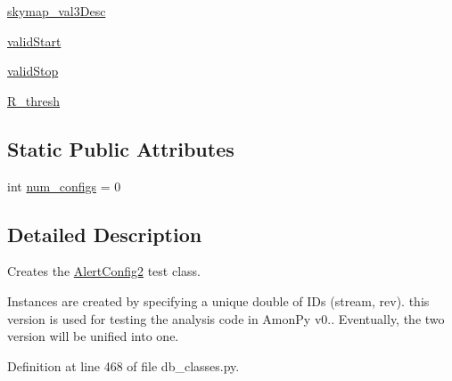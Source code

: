 \begin{DoxyCompactItemize}
\item 
\hyperlink{classamonpy_1_1dbase_1_1db__classes_1_1_alert_config2_a6c28894bd6690a2b0faeb36be8eb351f}{skymap\-\_\-val3\-Desc}
\item 
\hyperlink{classamonpy_1_1dbase_1_1db__classes_1_1_alert_config2_ac8bd043fc32dc2de20f5ee1cf57762e7}{valid\-Start}
\item 
\hyperlink{classamonpy_1_1dbase_1_1db__classes_1_1_alert_config2_a0338a9f4188da7e5b4e977a6d6a32dff}{valid\-Stop}
\item 
\hyperlink{classamonpy_1_1dbase_1_1db__classes_1_1_alert_config2_a94dabae815e574e6453b65d4efd9c0b0}{R\-\_\-thresh}
\end{DoxyCompactItemize}
\subsection*{Static Public Attributes}
\begin{DoxyCompactItemize}
\item 
int \hyperlink{classamonpy_1_1dbase_1_1db__classes_1_1_alert_config2_a17be669e8bdfa435ca0fe275a71479dd}{num\-\_\-configs} = 0
\end{DoxyCompactItemize}


\subsection{Detailed Description}
Creates the \hyperlink{classamonpy_1_1dbase_1_1db__classes_1_1_alert_config2}{Alert\-Config2} test class. 

Instances are created by specifying a unique double of I\-Ds (stream, rev). this version is used for testing the analysis code in Amon\-Py v0.. Eventually, the two version will be unified into one. 

Definition at line 468 of file db\-\_\-classes.\-py.



